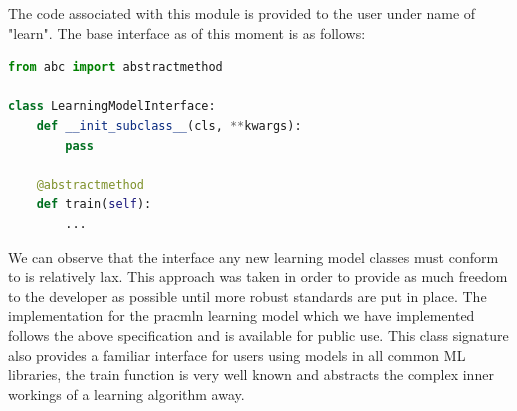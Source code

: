 The code associated with this module is provided to the user under name of "learn".
The base interface as of this moment is as follows:
\begin{lstlisting}[language=Python]
from abc import abstractmethod

class LearningModelInterface:
    def __init_subclass__(cls, **kwargs):
        pass

    @abstractmethod
    def train(self):
        ...
\end{lstlisting}
We can observe that the interface any new learning model classes must conform to is relatively lax.
This approach was taken in order to provide as much freedom to the developer as possible until more robust standards are put in place.
The implementation for the pracmln learning model which we have implemented follows the above specification and is available for public use.
This class signature also provides a familiar interface for users using models in all common ML libraries, the train function is very well known and abstracts the complex inner workings of a learning algorithm away.

